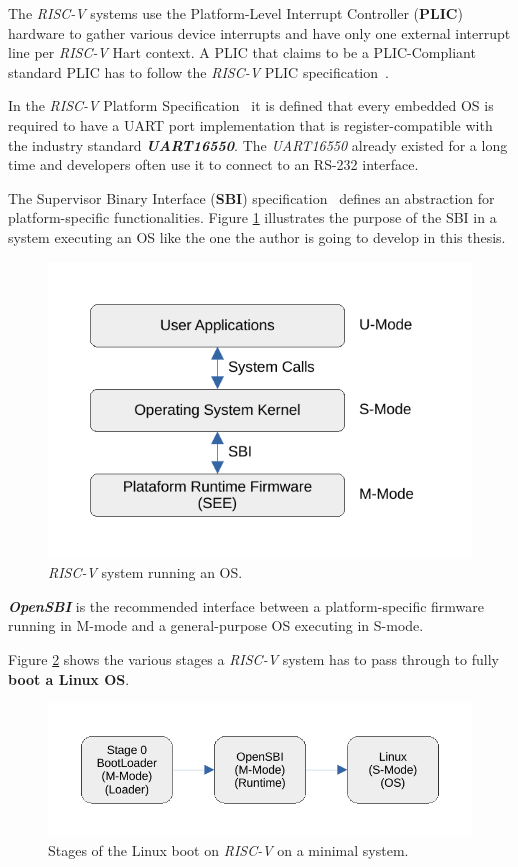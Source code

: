 The \textit{RISC-V} systems use the Platform-Level Interrupt Controller (\textbf{PLIC}) hardware to gather various device interrupts and have only one external interrupt line per \textit{RISC-V} Hart context. A PLIC that claims to be a PLIC-Compliant standard PLIC has to follow the \textit{RISC-V} PLIC specification~\cite{plic_riscv_spec}.

In the \textit{RISC-V} Platform Specification~\cite{riscv_platform_specification} it is defined that every embedded OS is required to have a UART port implementation that is register-compatible with the industry standard \textbf{\textit{UART16550}}. The \textit{UART16550} already existed for a long time and developers often use it to connect to an RS-232 interface.

The Supervisor Binary Interface (\textbf{SBI}) specification~\cite{sbi_riscv_spec} defines an abstraction for platform-specific functionalities. Figure \ref{fig:riscv_sbi} illustrates the purpose of the SBI in a system executing an OS like the one the author is going to develop in this thesis.

\begin{figure}[!h]
    \centering
    \includegraphics[width=0.8\linewidth]{../images/riscv_sbi.pdf}
    \caption{\textit{RISC-V} system running an OS.}
    \label{fig:riscv_sbi}
\end{figure}

\textbf{\textit{OpenSBI}} is the recommended interface between a platform-specific firmware running in M-mode and a general-purpose OS executing in S-mode.

Figure \ref{fig:linux_boot_flow} shows the various stages a \textit{RISC-V} system has to pass through to fully \textbf{boot a Linux OS}.

\begin{figure}[!h]
  \centering
  \includegraphics[width=0.9\linewidth]{../images/linux_boot_flow.pdf}
  \caption{Stages of the Linux boot on \textit{RISC-V} on a minimal system.}
  \label{fig:linux_boot_flow}
\end{figure}


